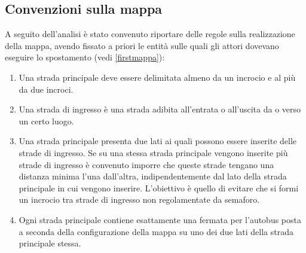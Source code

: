 \subsection{Convenzioni sulla mappa}
A seguito dell'analisi è stato convenuto riportare delle regole sulla
realizzazione della mappa, avendo fissato a priori le entità sulle quali gli
attori dovevano eseguire lo spostamento (vedi \ref{firstmappa}):
\begin{enumerate}
\item Una strada principale deve essere delimitata almeno da un incrocio e al
più da due incroci.
\item Una strada di ingresso è una strada adibita all'entrata o all'uscita da o
verso un certo luogo.
\item Una strada principale presenta due lati ai quali possono essere inserite
delle strade di ingresso. Se su una stessa strada principale vengono
inserite più strade di ingresso è convenuto imporre che queste strade tengano
una distanza minima l'una dall'altra, indipendentemente dal lato della strada
principale in cui vengono inserire. L'obiettivo è quello di evitare che si
formi un incrocio tra strade di ingresso non regolamentate da semaforo.
\item Ogni strada principale contiene esattamente una fermata per l'autobus
posta a seconda della configurazione della mappa su uno dei due lati della
strada principale stessa.
\end{enumerate}

